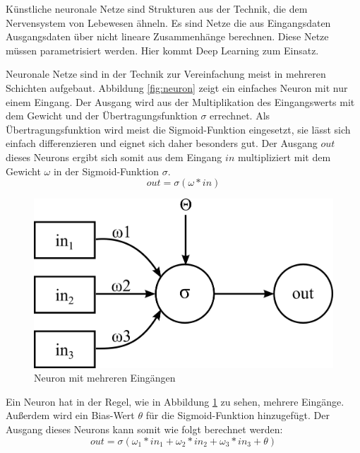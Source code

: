 Künstliche neuronale Netze sind Strukturen aus der Technik, die dem Nervensystem von Lebewesen ähneln. Es sind Netze die aus Eingangsdaten Ausgangsdaten über nicht lineare Zusammenhänge berechnen. Diese Netze müssen parametrisiert werden. Hier kommt Deep Learning zum Einsatz.

Neuronale Netze sind in der Technik zur Vereinfachung meist in mehreren Schichten aufgebaut. Abbildung \ref{fig:neuron} zeigt ein einfaches Neuron mit nur einem Eingang. Der Ausgang wird aus der Multiplikation des Eingangswerts mit dem Gewicht und der Übertragungsfunktion $\sigma$ errechnet. Als Übertragungsfunktion wird meist die Sigmoid-Funktion eingesetzt, sie lässt sich einfach differenzieren \citep{sigmoid} und eignet sich daher besonders gut. Der Ausgang $out$ dieses Neurons ergibt sich somit aus dem Eingang $in$ multipliziert mit dem Gewicht $\omega$ in der Sigmoid-Funktion $\sigma$.
$$out = \sigma(\omega * in)$$

\begin{figure}
	\centering
	\includegraphics[scale=1]{images/neuron-multiple-inputs.png}
	\caption{Neuron mit mehreren Eingängen}
	\label{fig:neuron-multiple-inputs}
\end{figure}

Ein Neuron hat in der Regel, wie in Abbildung \ref{fig:neuron-multiple-inputs} zu sehen, mehrere Eingänge. Außerdem wird ein Bias-Wert $\theta$ für die Sigmoid-Funktion hinzugefügt. Der Ausgang dieses Neurons kann somit wie folgt berechnet werden:
$$out = \sigma(\omega_1*in_1 + \omega_2*in_2 + \omega_3*in_3 + \theta)$$


